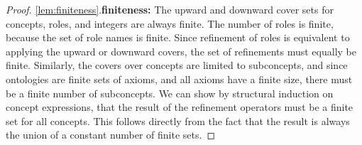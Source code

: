 \begin{proof}
  \item \ref{lem:finiteness}.\enspace \textbf{finiteness:\enspace}
  The upward and downward cover sets for concepts, roles, and integers are always finite. The number of roles is finite, because the set of role names is finite. Since refinement of roles is equivalent to applying the upward or downward covers, the set of refinements must equally be finite. Similarly, the covers over concepts are limited to subconcepts, and since ontologies are finite sets of axioms, and all axioms have a finite size, there must be a finite number of subconcepts. We can show by structural induction on concept expressions, that the result of the refinement operators must be a finite set for all concepts. This follows directly from the fact that the result is always the union of a constant number of finite sets.


\end{proof}
